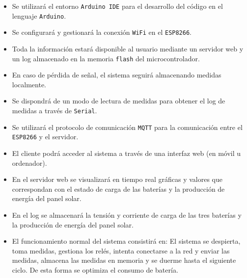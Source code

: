 \begin{itemize}
    \item Se utilizará el entorno \texttt{Arduino IDE} para el desarrollo del código en el lenguaje \texttt{Arduino}.
    \item Se configurará y gestionará la conexión \texttt{WiFi} en el \texttt{ESP8266}.
    \item Toda la información estará disponible al usuario mediante un servidor web y un log almacenado en la memoria \texttt{flash} del microcontrolador.
    \item En caso de pérdida de señal, el sistema seguirá almacenando medidas localmente.
    \item Se dispondrá de un modo de lectura de medidas para obtener el log de medidas a través de \texttt{Serial}.
    \item Se utilizará el protocolo de comunicación \texttt{MQTT} para la comunicación entre el \texttt{ESP8266} y el servidor.
    \item El cliente podrá acceder al sistema a través de una interfaz web (en móvil u ordenador).
    \item En el servidor web se visualizará en tiempo real gráficas y valores que correspondan con el estado de carga de las baterías y la producción de energía del panel solar.
    \item En el log se almacenará la tensión y corriente de carga de las tres baterías y la producción de energía del panel solar.
    \item El funcionamiento normal del sistema consistirá en: El sistema se despierta, toma medidas, gestiona los relés, intenta conectarse a la red y enviar las medidas, almacena las medidas en memoria y se duerme hasta el siguiente ciclo. De esta forma se optimiza el consumo de batería.
\end{itemize}
